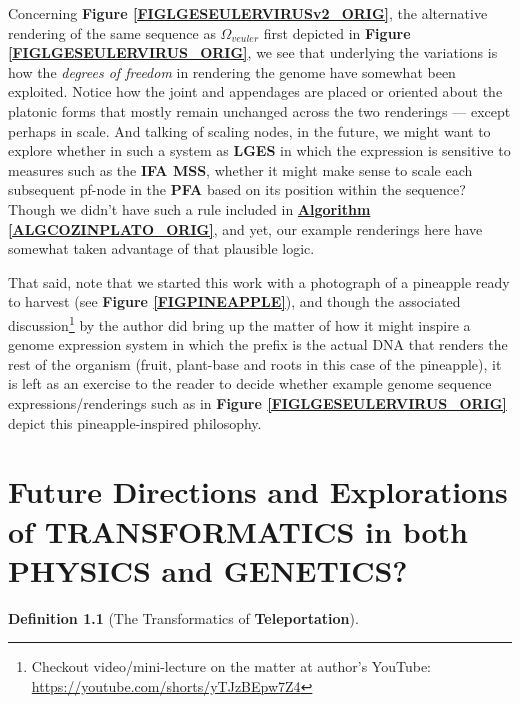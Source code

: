 \documentclass[a4paper, 18pt]{book} %
\newtheorem{defn}{Definition}
\begin{document}
\begin{appendices}
Concerning \textbf{Figure \ref{FIGLGESEULERVIRUSv2_ORIG}}, the alternative rendering  of the same sequence as $\Omega_{veuler}$ first depicted in \textbf{Figure \ref{FIGLGESEULERVIRUS_ORIG}}, we see that underlying the variations is how the \textit{degrees of freedom} in rendering the genome have somewhat been exploited. Notice how the joint and appendages are placed or oriented about the platonic forms that mostly remain unchanged across the two renderings --- except perhaps in scale. And talking of scaling nodes, in the future, we might want to explore whether in such a system as \textbf{LGES} in which the expression is sensitive to measures such as the \textbf{IFA MSS}, whether it might make sense to scale each subsequent pf-node in the \textbf{PFA} based on its position within the sequence? Though we didn't have such a rule included in \textbf{\hyperref[ALGCOZINPLATO_ORIG]{Algorithm \ref{ALGCOZINPLATO_ORIG}}}, and yet, our example renderings here have somewhat taken advantage of that plausible logic.

That said, note that we started this work with a photograph of a pineapple ready to harvest (see \textbf{Figure \ref{FIGPINEAPPLE}}), and though the associated discussion\footnote{Checkout video/mini-lecture on the matter at author's YouTube: \url{https://youtube.com/shorts/yTJzBEpw7Z4}} by the author did bring up the matter of how it might inspire a genome expression system in which the prefix is the actual DNA that renders the rest of the organism (fruit, plant-base and roots in this case of the pineapple), it is left as an exercise to the reader to decide whether example genome sequence expressions/renderings such as in \textbf{Figure \ref{FIGLGESEULERVIRUS_ORIG}} depict this pineapple-inspired philosophy.


\chapter{Future Directions and Explorations of TRANSFORMATICS in both PHYSICS and GENETICS?}


\begin{defn}[The Transformatics of \textbf{Teleportation}]


\end{defn}
\end{appendices}
\end{document}

